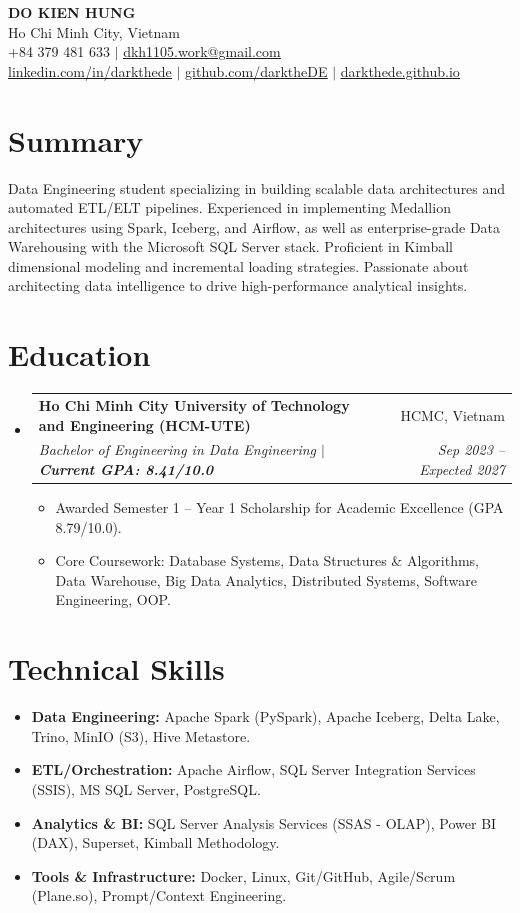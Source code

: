 \documentclass[10pt,a4paper]{article}
\makeatletter
\newcommand{\resumeItem}[1]{
  \item\small{
    {#1 \vspace{-2pt}}
  }
}
\newcommand{\resumeSubheading}[4]{
  \vspace{-1pt}\item
    \begin{tabular*}{0.97\textwidth}[t]{l@{\extracolsep{\fill}}r}
      \textbf{#1} & \small#2 \\
      \textit{\small#3} & \textit{\small #4} \\
    \end{tabular*}\vspace{-5pt}
}
\newcommand{\resumeSubHeadingListStart}{\begin{itemize}[leftmargin=0.15in, label={}]}
\newcommand{\resumeSubHeadingListEnd}{\end{itemize}}
\newcommand{\resumeItemListStart}{\begin{itemize}}
\newcommand{\resumeItemListEnd}{\end{itemize}\vspace{-5pt}}
\makeatother
\begin{document}
\begin{center}
    {\Huge \textbf{DO KIEN HUNG}} \\ \vspace{5pt}
    Ho Chi Minh City, Vietnam \\
    \small +84 379 481 633 $|$ \href{mailto:dkh1105.work@gmail.com}{\underline{dkh1105.work@gmail.com}} \\
    \href{https://www.linkedin.com/in/darkthede/}{\underline{linkedin.com/in/darkthede}} $|$
    \href{https://github.com/darktheDE}{\underline{github.com/darktheDE}} $|$
    \href{https://darkthede.github.io/}{\underline{darkthede.github.io}}
\end{center}

\section{Summary}
Data Engineering student specializing in building scalable data architectures and automated ETL/ELT pipelines. Experienced in implementing Medallion architectures using Spark, Iceberg, and Airflow, as well as enterprise-grade Data Warehousing with the Microsoft SQL Server stack. Proficient in Kimball dimensional modeling and incremental loading strategies. Passionate about architecting data intelligence to drive high-performance analytical insights.

\section{Education}
  \resumeSubHeadingListStart
    \resumeSubheading
      {Ho Chi Minh City University of Technology and Engineering (HCM-UTE)}{HCMC, Vietnam}
      {Bachelor of Engineering in Data Engineering $|$ \textbf{Current GPA: 8.41/10.0}}{Sep 2023 -- Expected 2027}
      \resumeItemListStart
        \resumeItem{Awarded Semester 1 -- Year 1 Scholarship for Academic Excellence (GPA 8.79/10.0).}
        \resumeItem{Core Coursework: Database Systems, Data Structures \& Algorithms, Data Warehouse, Big Data Analytics, Distributed Systems, Software Engineering, OOP.}
      \resumeItemListEnd
  \resumeSubHeadingListEnd

\section{Technical Skills}
  \resumeSubHeadingListStart
    \resumeItemListStart
        \resumeItem{\textbf{Data Engineering:} Apache Spark (PySpark), Apache Iceberg, Delta Lake, Trino, MinIO (S3), Hive Metastore.}
        \resumeItem{\textbf{ETL/Orchestration:} Apache Airflow, SQL Server Integration Services (SSIS), MS SQL Server, PostgreSQL.}
        \resumeItem{\textbf{Analytics \& BI:} SQL Server Analysis Services (SSAS - OLAP), Power BI (DAX), Superset, Kimball Methodology.}
        \resumeItem{\textbf{Tools \& Infrastructure:} Docker, Linux, Git/GitHub, Agile/Scrum (Plane.so), Prompt/Context Engineering.}
    \resumeItemListEnd
  \resumeSubHeadingListEnd
\end{document}
